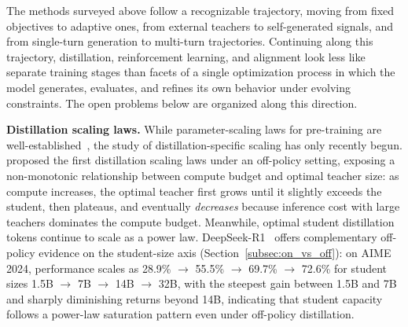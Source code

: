 \documentclass{article} %
\begin{document}
The methods surveyed above follow a recognizable trajectory, moving from fixed objectives to adaptive ones, from external teachers to self-generated signals, and from single-turn generation to multi-turn trajectories. Continuing along this trajectory, distillation, reinforcement learning, and alignment look less like separate training stages than facets of a single optimization process in which the model generates, evaluates, and refines its own behavior under evolving constraints. The open problems below are organized along this direction.

\textbf{Distillation scaling laws.} While parameter-scaling laws for pre-training are well-established~\citep{2001.08361,2203.15556}, the study of distillation-specific scaling has only recently begun. \citet{2502.08606} proposed the first distillation scaling laws under an off-policy setting, exposing a non-monotonic relationship between compute budget and optimal teacher size: as compute increases, the optimal teacher first grows until it slightly exceeds the student, then plateaus, and eventually \emph{decreases} because inference cost with large teachers dominates the compute budget. Meanwhile, optimal student distillation tokens continue to scale as a power law. DeepSeek-R1~\citep{2501.12948} offers complementary off-policy evidence on the student-size axis (Section~\ref{subsec:on_vs_off}): on AIME 2024, performance scales as 28.9\% $\to$ 55.5\% $\to$ 69.7\% $\to$ 72.6\% for student sizes 1.5B $\to$ 7B $\to$ 14B $\to$ 32B, with the steepest gain between 1.5B and 7B and sharply diminishing returns beyond 14B, indicating that student capacity follows a power-law saturation pattern even under off-policy distillation.
\end{document}
